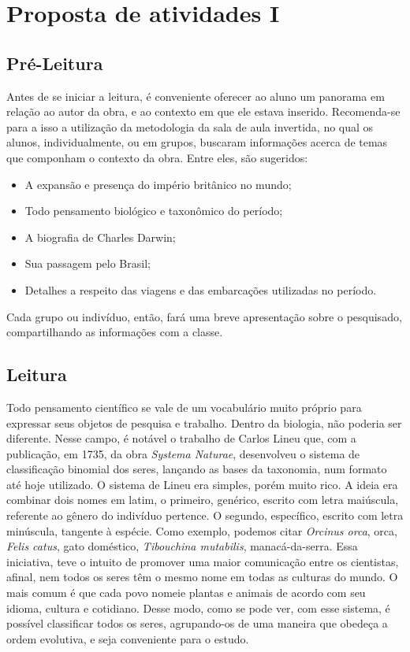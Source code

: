 \documentclass[12pt]{extarticle}
\begin{document}
\tableofcontents

\section{Proposta de atividades I}

\subsection{Pré-Leitura}

Antes de se iniciar a leitura, é conveniente oferecer ao
aluno um panorama em relação ao autor da obra, e ao contexto em que ele
estava inserido. Recomenda-se para a isso a utilização da metodologia da
sala de aula invertida, no qual os alunos, individualmente, ou em
grupos, buscaram informações acerca de temas que componham o contexto da
obra. Entre eles, são sugeridos:

\begin{itemize}
\item
  A expansão e presença do império britânico no mundo;
\item
  Todo pensamento biológico e taxonômico do período;
\item
  A biografia de Charles Darwin;
\item
  Sua passagem pelo Brasil;
\item
  Detalhes a respeito das viagens e das embarcações utilizadas no
  período.
\end{itemize}

Cada grupo ou indivíduo, então, fará uma breve apresentação sobre o
pesquisado, compartilhando as informações com a classe.

\subsection{Leitura}


Todo pensamento científico se vale de um vocabulário muito
próprio para expressar seus objetos de pesquisa e trabalho. Dentro da
biologia, não poderia ser diferente. Nesse campo, é notável o trabalho
de Carlos Lineu que, com a publicação, em 1735, da obra \emph{Systema
Naturae}, desenvolveu o sistema de classificação binomial dos seres,
lançando as bases da taxonomia, num formato até hoje utilizado. O
sistema de Lineu era simples, porém muito rico. A ideia era combinar
dois nomes em latim, o primeiro, genérico, escrito com letra maiúscula,
referente ao gênero do indivíduo pertence. O segundo, específico,
escrito com letra minúscula, tangente à espécie. Como exemplo, podemos
citar \emph{Orcinus orca}, orca, \emph{Felis catus}, gato doméstico,
\emph{Tibouchina mutabilis}, manacá-da-serra. Essa iniciativa, teve o
intuito de promover uma maior comunicação entre os cientistas, afinal,
nem todos os seres têm o mesmo nome em todas as culturas do mundo. O
mais comum é que cada povo nomeie plantas e animais de acordo com seu
idioma, cultura e cotidiano. Desse modo, como se pode ver, com esse
sistema, é possível classificar todos os seres, agrupando-os de uma
maneira que obedeça a ordem evolutiva, e seja conveniente para o estudo.
\end{document}
